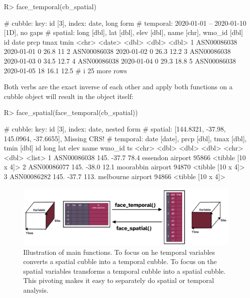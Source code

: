 \documentclass[
  shortnames]{jss}
\begin{document}
\begin{CodeChunk}
\begin{CodeInput}
R> face_temporal(cb_spatial)
\end{CodeInput}
\begin{CodeOutput}
# cubble:   key: id [3], index: date, long form
# temporal: 2020-01-01 -- 2020-01-10 [1D], no gaps
# spatial:  long [dbl], lat [dbl], elev [dbl], name [chr], wmo_id [dbl]
  id          date        prcp  tmax  tmin
  <chr>       <date>     <dbl> <dbl> <dbl>
1 ASN00086038 2020-01-01     0  26.8  11  
2 ASN00086038 2020-01-02     0  26.3  12.2
3 ASN00086038 2020-01-03     0  34.5  12.7
4 ASN00086038 2020-01-04     0  29.3  18.8
5 ASN00086038 2020-01-05    18  16.1  12.5
# i 25 more rows
\end{CodeOutput}
\end{CodeChunk}

Both verbs are the exact inverse of each other and apply both functions on a cubble object will result in the object itself:

\begin{CodeChunk}
\begin{CodeInput}
R> face_spatial(face_temporal(cb_spatial))
\end{CodeInput}
\begin{CodeOutput}
# cubble:   key: id [3], index: date, nested form
# spatial:  [144.8321, -37.98, 145.0964, -37.6655], Missing CRS!
# temporal: date [date], prcp [dbl], tmax [dbl], tmin [dbl]
  id           long   lat  elev name              wmo_id ts               
  <chr>       <dbl> <dbl> <dbl> <chr>              <dbl> <list>           
1 ASN00086038  145. -37.7  78.4 essendon airport   95866 <tibble [10 x 4]>
2 ASN00086077  145. -38.0  12.1 moorabbin airport  94870 <tibble [10 x 4]>
3 ASN00086282  145. -37.7 113.  melbourne airport  94866 <tibble [10 x 4]>
\end{CodeOutput}
\end{CodeChunk}

\begin{CodeChunk}
\begin{figure}

{\centering \includegraphics[width=1\linewidth]{figures/diagram-keynotes/diagram-keynotes.001} 

}

\caption{Illustration of main functions. To focus on he temporal variables  converts a spatial cubble into a temporal cubble. To focus on the spatial variables  transforms a temporal cubble into a spatial cubble. This pivoting makes it easy to separately do spatial or temporal analysis.}\label{fig:face}
\end{figure}
\end{CodeChunk}
\end{document}
